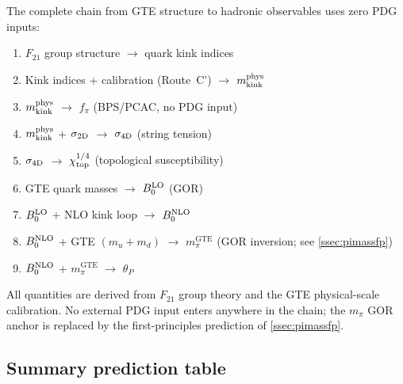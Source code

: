 \documentclass[11pt]{article}
\theoremstyle{remark}
\newcommand{\GTE}{\text{GTE}}
\newcommand{\Ftwentyone}{F_{21}}
\begin{document}
The complete chain from GTE structure to hadronic observables uses zero PDG
inputs:
\begin{enumerate}[leftmargin=2em]
\item $\Ftwentyone$ group structure $\to$ quark kink indices
\item Kink indices + calibration (Route~C') $\to$ $m_{\rm kink}^{\rm phys}$
\item $m_{\rm kink}^{\rm phys}$ $\to$ $f_\pi$ (BPS/PCAC, no PDG input)
\item $m_{\rm kink}^{\rm phys}$ + $\sigma_{2\rm D}$ $\to$ $\sigma_{4\rm D}$
  (string tension)
\item $\sigma_{4\rm D}$ $\to$ $\chi_{\rm top}^{1/4}$ (topological
  susceptibility)
\item GTE quark masses $\to$ $B_0^{\rm LO}$ (GOR)
\item $B_0^{\rm LO}$ + NLO kink loop $\to$ $B_0^{\rm NLO}$
\item $B_0^{\rm NLO}$ + GTE $(m_u{+}m_d)$ $\to$ $m_\pi^{\GTE}$
  (GOR inversion; see \cref{ssec:pimassfp})
\item $B_0^{\rm NLO}$ + $m_\pi^{\GTE}$ $\to$ $\theta_P$
\end{enumerate}
All quantities are derived from $\Ftwentyone$ group theory and the GTE
physical-scale calibration.
No external PDG input enters anywhere in the chain; the $m_\pi$ GOR anchor is
replaced by the first-principles prediction of \cref{ssec:pimassfp}.

\subsection{Summary prediction table}
\label{ssec:predtable}
\end{document}
